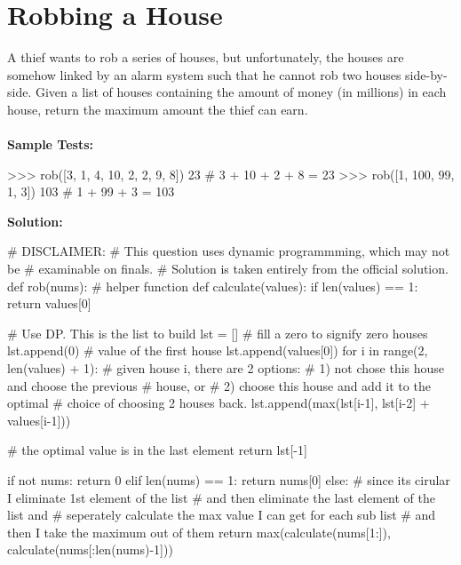 \section{Robbing a House}
A thief wants to rob a series of houses, but unfortunately, the houses are somehow
linked by an alarm system such that he cannot rob two houses side-by-side. Given a list
of houses containing the amount of money (in millions) in each house, return the
maximum amount the thief can earn. \\ \\
\textbf{Sample Tests:}
\begin{python}
>>> rob([3, 1, 4, 10, 2, 2, 9, 8])
23  # 3 + 10 + 2 + 8 = 23
>>> rob([1, 100, 99, 1, 3])
103 # 1 + 99 + 3 = 103
\end{python}
\textbf{Solution:}
\begin{python}
# DISCLAIMER:
# This question uses dynamic programmming, which may not be
# examinable on finals.
# Solution is taken entirely from the official solution.
def rob(nums):
    # helper function
    def calculate(values):
        if len(values) == 1:
            return values[0]

        # Use DP. This is the list to build
        lst = []
        # fill a zero to signify zero houses
        lst.append(0)
        # value of the first house
        lst.append(values[0])
        for i in range(2, len(values) + 1):            
            # given house i, there are 2 options:
            # 1) not chose this house and choose the previous
            #    house, or
            # 2) choose this house and add it to the optimal
            #    choice of choosing 2 houses back.
            lst.append(max(lst[i-1], lst[i-2] + values[i-1]))

        # the optimal value is in the last element
        return lst[-1]

    if not nums:
        return 0
    elif len(nums) == 1:
        return nums[0]
    else:
        # since its cirular I eliminate 1st element of the list
        # and then eliminate the last element of the list and 
        # seperately calculate the max value I can get for each sub list
        # and then I take the maximum out of them
        return max(calculate(nums[1:]), calculate(nums[:len(nums)-1]))
\end{python}

\newpage

